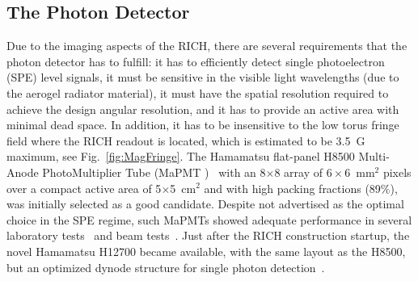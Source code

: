 \documentclass[5p,times,twocolumn]{elsarticle}
\def\MaPMT{MaPMT }
\begin{document}
\subsection{The Photon Detector}

Due to the imaging aspects of the RICH, there are several requirements that the photon detector has to fulfill: it has
to efficiently detect single photoelectron (SPE) level signals, it must be sensitive in the visible light wavelengths (due
to the aerogel radiator material), it must have the spatial resolution required to achieve the design angular resolution,
and it has to provide an active area with minimal dead space. In addition, it has to be insensitive to the low torus fringe
field where the RICH readout is located, which is estimated to be 3.5~G maximum, see Fig.~\ref{fig:MagFringe}.
The Hamamatsu flat-panel H8500 Multi-Anode PhotoMultiplier Tube (\MaPMT)~\cite{Ref:H8500} with an 8$\times$8
array of $6 \times 6$~mm$^2$ pixels over a compact active area of 5$\times$5~cm$^2$ and with high packing
fractions (89\%), was initially selected as a good candidate.
Despite not advertised as the optimal choice in the SPE regime, such MaPMTs showed adequate performance in several
laboratory tests~\cite{REF:MaPMT_test} and beam tests~\cite{REF:RICH_CERN}.
Just after the RICH construction startup, the novel Hamamatsu H12700 became available, with the same layout as
the H8500, but an optimized dynode structure for single photon detection~\cite{Ref:H12700}.
\end{document}
